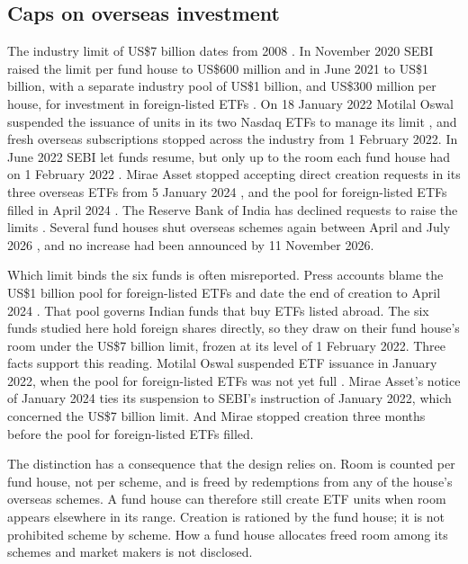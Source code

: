 \documentclass[10pt,journal,a4paper]{IEEEtran}
\theoremstyle{definition}
\begin{document}
\subsection{Caps on overseas investment}
The industry limit of US\$7 billion dates from 2008 \citep{lawasia2026}. In November 2020 SEBI raised the limit per fund house to US\$600 million \citep{bs2020limit} and in June 2021 to US\$1 billion, with a separate industry pool of US\$1 billion, and US\$300 million per house, for investment in foreign-listed ETFs \citep{bs2021limit}. On 18 January 2022 Motilal Oswal suspended the issuance of units in its two Nasdaq ETFs to manage its limit \citep{bs2022motilal}, and fresh overseas subscriptions stopped across the industry from 1 February 2022. In June 2022 SEBI let funds resume, but only up to the room each fund house had on 1 February 2022 \citep{pti2022resume}. Mirae Asset stopped accepting direct creation requests in its three overseas ETFs from 5 January 2024 \citep{mirae2024addendum}, and the pool for foreign-listed ETFs filled in April 2024 \citep{zerodha2024etf}. The Reserve Bank of India has declined requests to raise the limits \citep{bs2023rbi}. Several fund houses shut overseas schemes again between April and July 2026 \citep{outlook2026menu}, and no increase had been announced by 11 November 2026.

Which limit binds the six funds is often misreported. Press accounts blame the US\$1 billion pool for foreign-listed ETFs and date the end of creation to April 2024 \citep[for example][]{vr2026up41}. That pool governs Indian funds that buy ETFs listed abroad. The six funds studied here hold foreign shares directly, so they draw on their fund house's room under the US\$7 billion limit, frozen at its level of 1 February 2022. Three facts support this reading. Motilal Oswal suspended ETF issuance in January 2022, when the pool for foreign-listed ETFs was not yet full \citep{bs2022bind}. Mirae Asset's notice of January 2024 ties its suspension to SEBI's instruction of January 2022, which concerned the US\$7 billion limit. And Mirae stopped creation three months before the pool for foreign-listed ETFs filled.

The distinction has a consequence that the design relies on. Room is counted per fund house, not per scheme, and is freed by redemptions from any of the house's overseas schemes. A fund house can therefore still create ETF units when room appears elsewhere in its range. Creation is rationed by the fund house; it is not prohibited scheme by scheme. How a fund house allocates freed room among its schemes and market makers is not disclosed.
\end{document}
